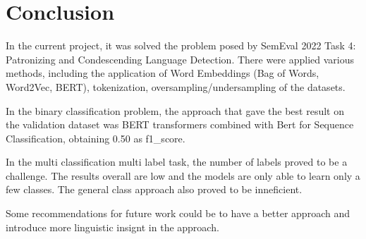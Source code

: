 \documentclass[11pt]{article}
\begin{document}
\begin{enumerate}
\begin{enumerate}
	      \end{enumerate}
\end{enumerate}


\section{Conclusion}

In the current project, it was solved the problem posed by SemEval 2022 Task
4: Patronizing and Condescending Language Detection. There were applied
various methods, including the application of Word Embeddings (Bag of Words,
Word2Vec, BERT), tokenization, oversampling/undersampling of the datasets.

In the binary classification problem, the approach that gave the best result
on the validation dataset was BERT transformers combined with Bert for
Sequence Classification, obtaining 0.50 as f1\_score.

In the multi classification multi label task, the number of labels proved to
be a challenge. The results overall are low and the models are only able to learn
only a few classes. The general class approach also proved to be inneficient.

Some recommendations for future work could be to have a better approach and introduce
more linguistic insignt in the approach.


\end{document}
